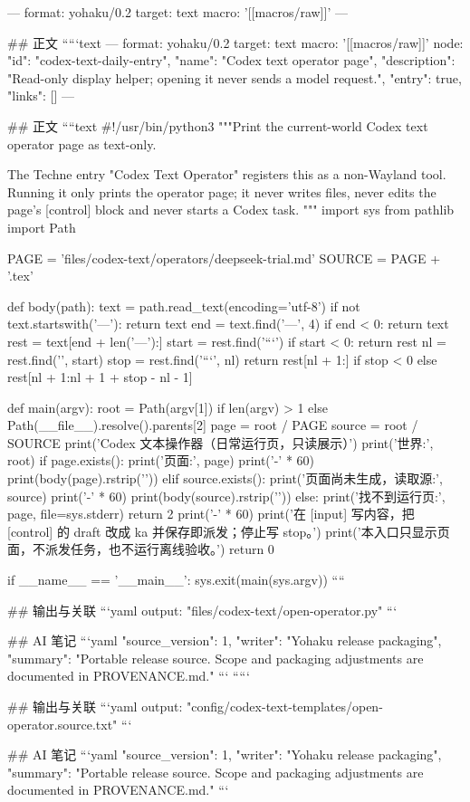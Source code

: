 ---
format: yohaku/0.2
target: text
macro: '[[macros/raw]]'
---

## 正文
`````text
---
format: yohaku/0.2
target: text
macro: '[[macros/raw]]'
node: {"id": "codex-text-daily-entry", "name": "Codex text operator page", "description": "Read-only display helper; opening it never sends a model request.", "entry": true, "links": []}
---

## 正文
````text
#!/usr/bin/python3
"""Print the current-world Codex text operator page as text-only.

The Techne entry "Codex Text Operator" registers this as a non-Wayland tool.
Running it only prints the operator page; it never writes files, never edits the
page's [control] block and never starts a Codex task.
"""
import sys
from pathlib import Path

PAGE = 'files/codex-text/operators/deepseek-trial.md'
SOURCE = PAGE + '.tex'


def body(path):
    text = path.read_text(encoding='utf-8')
    if not text.startswith('---\n'):
        return text
    end = text.find('\n---\n', 4)
    if end < 0:
        return text
    rest = text[end + len('\n---\n'):]
    start = rest.find('```')
    if start < 0:
        return rest
    nl = rest.find('\n', start)
    stop = rest.find('\n```', nl)
    return rest[nl + 1:] if stop < 0 else rest[nl + 1:nl + 1 + stop - nl - 1]


def main(argv):
    root = Path(argv[1]) if len(argv) > 1 else Path(__file__).resolve().parents[2]
    page = root / PAGE
    source = root / SOURCE
    print('Codex 文本操作器（日常运行页，只读展示）')
    print('世界:', root)
    if page.exists():
        print('页面:', page)
        print('-' * 60)
        print(body(page).rstrip('\n'))
    elif source.exists():
        print('页面尚未生成，读取源:', source)
        print('-' * 60)
        print(body(source).rstrip('\n'))
    else:
        print('找不到运行页:', page, file=sys.stderr)
        return 2
    print('-' * 60)
    print('在 [input] 写内容，把 [control] 的 draft 改成 ka 并保存即派发；停止写 stop。')
    print('本入口只显示页面，不派发任务，也不运行离线验收。')
    return 0


if __name__ == '__main__':
    sys.exit(main(sys.argv))
````

## 输出与关联
```yaml
output: "files/codex-text/open-operator.py"
```

## AI 笔记
```yaml
{"source_version": 1, "writer": "Yohaku release packaging", "summary": "Portable release source. Scope and packaging adjustments are documented in PROVENANCE.md."}
```
`````

## 输出与关联
```yaml
output: "config/codex-text-templates/open-operator.source.txt"
```

## AI 笔记
```yaml
{"source_version": 1, "writer": "Yohaku release packaging", "summary": "Portable release source. Scope and packaging adjustments are documented in PROVENANCE.md."}
```
